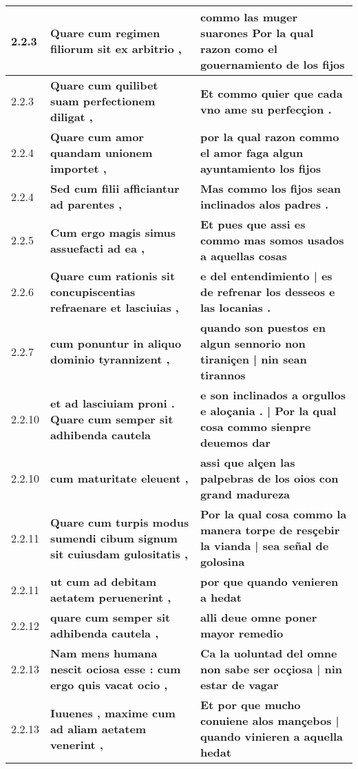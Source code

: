 \begin{tabular}{|p{1cm}|p{6.5cm}|p{6.5cm}|}
2.2.3 &  \textbf{ Quare cum regimen filiorum sit ex arbitrio , }  &  \textbf{ commo las muger suarones Por la qual razon como el gouernamiento de los fijos }  \\\hline
2.2.3 &  \textbf{ Quare cum quilibet suam perfectionem diligat , }  &  \textbf{ Et commo quier que cada vno ame su perfecçion . }  \\\hline
2.2.4 &  \textbf{ Quare cum amor quandam unionem importet , }  &  \textbf{ por la qual razon commo el amor faga algun ayuntamiento los fijos }  \\\hline
2.2.4 &  \textbf{ Sed cum filii afficiantur ad parentes , }  &  \textbf{ Mas commo los fijos sean inclinados alos padres . }  \\\hline
2.2.5 &  \textbf{ Cum ergo magis simus assuefacti ad ea , }  &  \textbf{ Et pues que assi es commo mas somos usados a aquellas cosas }  \\\hline
2.2.6 &  \textbf{ Quare cum rationis sit concupiscentias refraenare et lasciuias , }  &  \textbf{ e del entendimiento | es de refrenar los desseos e las locanias . }  \\\hline
2.2.7 &  \textbf{ cum ponuntur in aliquo dominio tyrannizent , }  &  \textbf{ quando son puestos en algun sennorio non tiraniçen | nin sean tirannos }  \\\hline
2.2.10 &  \textbf{ et ad lasciuiam proni . Quare cum semper sit adhibenda cautela }  &  \textbf{ e son inclinados a orgullos e aloçania . | Por la qual cosa commo sienpre deuemos dar }  \\\hline
2.2.10 &  \textbf{ cum maturitate eleuent , }  &  \textbf{ assi que alçen las palpebras de los oios con grand madureza }  \\\hline
2.2.11 &  \textbf{ Quare cum turpis modus sumendi cibum signum sit cuiusdam gulositatis , }  &  \textbf{ Por la qual cosa commo la manera torpe de resçebir la vianda | sea señal de golosina }  \\\hline
2.2.11 &  \textbf{ ut cum ad debitam aetatem peruenerint , }  &  \textbf{ por que quando venieren a hedat }  \\\hline
2.2.12 &  \textbf{ quare cum semper sit adhibenda cautela , }  &  \textbf{ alli deue omne poner mayor remedio }  \\\hline
2.2.13 &  \textbf{ Nam mens humana nescit ociosa esse : cum ergo quis vacat ocio , }  &  \textbf{ Ca la uoluntad del omne non sabe ser ocçiosa | nin estar de vagar }  \\\hline
2.2.13 &  \textbf{ Iuuenes , maxime cum ad aliam aetatem venerint , }  &  \textbf{ Et por que mucho conuiene alos mançebos | quando vinieren a aquella hedat }  \\\hline

\end{tabular}
